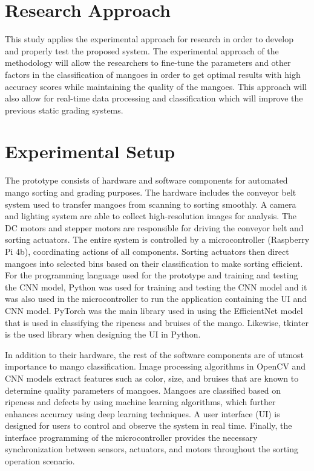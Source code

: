 \section{Research Approach}
This study applies the experimental approach for research in order to develop and properly test the proposed system. The experimental approach of the methodology will allow the researchers to fine-tune the parameters and other factors in the classification of mangoes in order to get optimal results with high accuracy scores while maintaining the quality of the mangoes. This approach will also allow for real-time data processing and classification which will improve the previous static grading systems.

\section{Experimental Setup}
The prototype consists of hardware and software components for automated mango sorting and grading purposes. The hardware includes the conveyor belt system used to transfer mangoes from scanning to sorting smoothly. A camera and lighting system are able to collect high-resolution images for analysis. The DC motors and stepper motors are responsible for driving the conveyor belt and sorting actuators. The entire system is controlled by a microcontroller (Raspberry Pi 4b), coordinating actions of all components. Sorting actuators then direct mangoes into selected bins based on their classification to make sorting efficient. For the programming language used for the prototype and training and testing the CNN model, Python was used for training and testing the CNN model and it was also used in the microcontroller to run the application containing the UI and CNN model. PyTorch was the main library used in using the EfficientNet model that is used in classifying the ripeness and bruises of the mango. Likewise, tkinter is the used library when designing the UI in Python.

In addition to their hardware, the rest of the software components are of utmost importance to mango classification. Image processing algorithms in OpenCV and CNN models extract features such as color, size, and bruises that are known to determine quality parameters of mangoes. Mangoes are classified based on ripeness and defects by using machine learning algorithms, which further enhances accuracy using deep learning techniques. A user interface (UI) is designed for users to control and observe the system in real time. Finally, the interface programming of the microcontroller provides the necessary synchronization between sensors, actuators, and motors throughout the sorting operation scenario.

